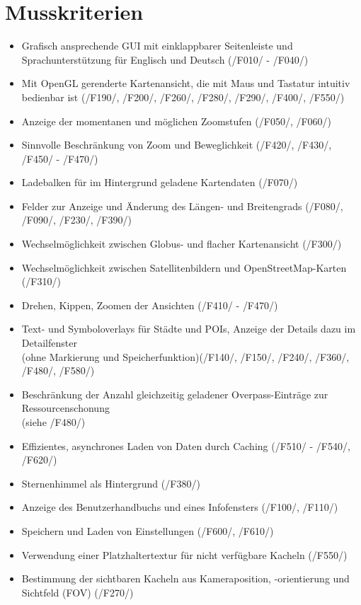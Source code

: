 \documentclass[10pt]{scrreprt}
\newcommand{\ziel}[1]{{\fontsize{9.5}{11}\textsf{/#1/}}}
\begin{document}
\section{Musskriterien}
\begin{itemize}
\item Grafisch ansprechende GUI mit einklappbarer Seitenleiste und\\ Sprachunterstützung für Englisch und Deutsch (\ziel{F010} - \ziel{F040})
\item Mit OpenGL gerenderte Kartenansicht, die mit Maus und Tastatur intuitiv bedienbar ist (\ziel{F190}, \ziel{F200}, \ziel{F260}, \ziel{F280}, \ziel{F290}, \ziel{F400}, \ziel{F550})
\item Anzeige der momentanen und möglichen Zoomstufen (\ziel{F050}, \ziel{F060})
\item Sinnvolle Beschränkung von Zoom und Beweglichkeit (\ziel{F420}, \ziel{F430}, \ziel{F450} - \ziel{F470})
\item Ladebalken für im Hintergrund geladene Kartendaten (\ziel{F070})
\item Felder zur Anzeige und Änderung des Längen- und Breitengrads (\ziel{F080}, \ziel{F090}, \ziel{F230}, \ziel{F390})
\item Wechselmöglichkeit zwischen Globus- und flacher Kartenansicht (\ziel{F300})
\item Wechselmöglichkeit zwischen Satellitenbildern und OpenStreetMap-Karten (\ziel{F310})
\item Drehen, Kippen, Zoomen der Ansichten (\ziel{F410} - \ziel{F470})
\item Text- und Symboloverlays für Städte und POIs, Anzeige der Details dazu im Detailfenster\\(ohne Markierung und Speicherfunktion)(\ziel{F140}, \ziel{F150}, \ziel{F240}, \ziel{F360}, \ziel{F480}, \ziel{F580})
\item Beschränkung der Anzahl gleichzeitig geladener Overpass-Einträge zur Ressourcenschonung \\(siehe \ziel{F480})
\item Effizientes, asynchrones Laden von Daten durch Caching (\ziel{F510} - \ziel{F540}, \ziel{F620})
\item Sternenhimmel als Hintergrund (\ziel{F380})
\item Anzeige des Benutzerhandbuchs und eines Infofensters (\ziel{F100}, \ziel{F110})
\item Speichern und Laden von Einstellungen (\ziel{F600}, \ziel{F610})
\item Verwendung einer Platzhaltertextur für nicht verfügbare Kacheln (\ziel{F550})
\item Bestimmung der sichtbaren Kacheln aus Kameraposition, -orientierung und Sichtfeld (FOV) (\ziel{F270})
\end{itemize}
\end{document}
